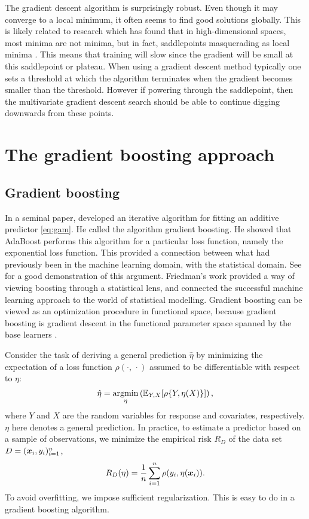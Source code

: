 The gradient descent algorithm is surprisingly robust. Even though it may converge to a local minimum, it often seems to find good solutions globally. This is likely related to research which has found that in high-dimensional spaces, most minima are not minima, but in fact, saddlepoints masquerading as local minima \citep{saddlepoints}. This means that training will slow since the gradient will be small at this saddlepoint or plateau. When using a gradient descent method typically one sets a threshold at which the algorithm terminates when the gradient becomes smaller than the threshold. However if powering through the saddlepoint, then the multivariate gradient descent search should be able to continue digging downwards from these points.

\section{The gradient boosting approach}
\subsection{Gradient boosting}
In a seminal paper, \citet{friedman2001} developed an iterative algorithm for fitting an additive predictor \eqref{eq:gam}.
He called the algorithm gradient boosting.
He showed that AdaBoost performs this algorithm for a particular loss function, namely the exponential loss function.
This provided a connection between what had previously been in the machine learning domain, with the statistical domain.
See \citet{ESL} for a good demonstration of this argument.
Friedman's work provided a way of viewing boosting through a statistical lens, and connected the successful machine learning approach to the world of statistical modelling.
Gradient boosting can be viewed as an optimization procedure in functional space, because gradient boosting is gradient descent in the functional parameter space spanned by the base learners \citep{friedman2001, buhlmann2007}.

Consider the task of deriving a general prediction $\hat{\eta}$ by minimizing the expectation of a loss function $\rho(\cdot,\,\cdot)$
assumed to be differentiable with respect to $\eta$:
\begin{equation*}\label{eq:min}
    \hat{\eta}=\operatorname*{argmin}_\eta\left(\mathbb{E}_{Y,X}[\rho\{Y,\eta(X)\}]\right),
\end{equation*}
where $Y$ and $X$ are the random variables for response and covariates, respectively.
$\eta$ here denotes a general prediction.
In practice, to estimate a predictor based on a sample of observations, we minimize the empirical risk $R_D$ of the data set
$D=(\bm{x}_i,y_i)_{i=1}^n$,
\begin{equation*}
    R_D(\eta)=\frac{1}{n}\sum_{i=1}^n \rho(y_i,\eta(\bm{x}_i)).
\end{equation*}
To avoid overfitting, we impose sufficient regularization. This is easy to do in a gradient boosting algorithm.

